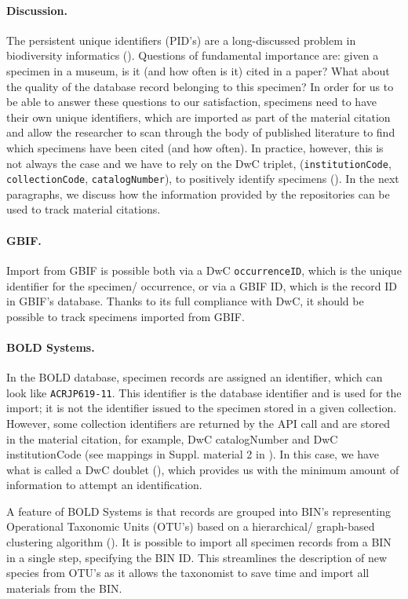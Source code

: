 \paragraph{Discussion.} The persistent unique identifiers (PID's) are a long-discussed problem in biodiversity informatics (\cite{guralnick_trouble_2014}). Questions of fundamental importance are: given a specimen in a museum, is it (and how often is it) cited in a paper? What about the quality of the database record belonging to this specimen? In order for us to be able to answer these questions to our satisfaction, specimens need to have their own unique identifiers, which are imported as part of the material citation and allow the researcher to scan through the body of published literature to find which specimens have been cited (and how often). In practice, however, this is not always the case and we have to rely on the DwC triplet, ({\tt institutionCode}, {\tt collectionCode}, {\tt catalogNumber}), to positively identify specimens (\cite{guralnick_trouble_2014}). In the next paragraphs, we discuss how the information provided by the repositories can be used to track material citations.

\paragraph{GBIF.} Import from GBIF is possible both via a DwC {\tt occurrenceID}, which is the unique identifier for the specimen/ occurrence, or via a GBIF ID, which is the record ID in GBIF's database. Thanks to its full compliance with DwC, it should be possible to track specimens imported from GBIF.

\paragraph{BOLD Systems.} In the BOLD database, specimen records are assigned an identifier, which can look like {\tt ACRJP619-11}. This identifier is the database identifier and is used for the import; it is not the identifier issued to the specimen stored in a given collection. However, some collection identifiers are returned by the API call and are stored in the material citation, for example, DwC catalogNumber and DwC institutionCode (see mappings in Suppl. material 2 in \cite{senderov_online_2016}). In this case, we have what is called a DwC doublet (\cite{guralnick_trouble_2014}), which provides us with the minimum amount of information to attempt an identification.

A feature of BOLD Systems is that records are grouped into BIN's representing Operational Taxonomic Units (OTU's) based on a hierarchical/ graph-based clustering algorithm (\cite{ratnasingham_dna-based_2013}). It is possible to import all specimen records from a BIN in a single step, specifying the BIN ID. This streamlines the description of new species from OTU's as it allows the taxonomist to save time and import all materials from the BIN.

